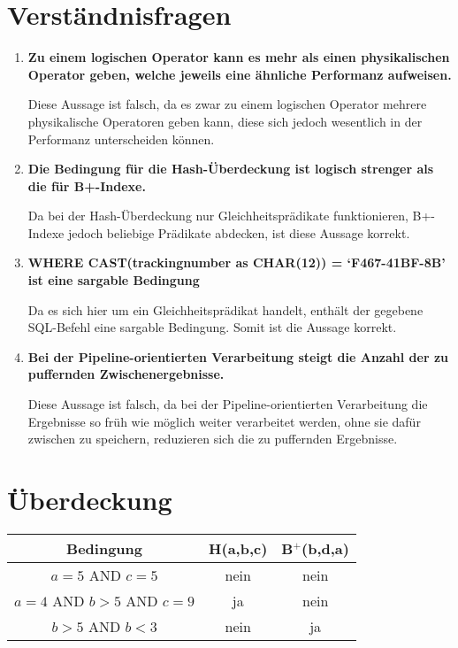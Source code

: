 \documentclass{scrartcl}
\begin{document}
\maketitle

\section{Verständnisfragen}
\begin{enumerate}
    \item \textbf{Zu einem logischen Operator kann es mehr als einen physikalischen Operator geben, welche jeweils eine ähnliche Performanz aufweisen.}

    Diese Aussage ist falsch, da es zwar zu einem logischen Operator mehrere physikalische Operatoren geben kann, diese sich jedoch wesentlich in der Performanz unterscheiden können.
    \item \textbf{Die Bedingung für die Hash-Überdeckung ist logisch strenger als die für B+-Indexe.}

    Da bei der Hash-Überdeckung nur Gleichheitsprädikate funktionieren, B+-Indexe jedoch beliebige Prädikate abdecken, ist diese Aussage korrekt.
    \item \textbf{WHERE CAST(trackingnumber as CHAR(12)) = ‘F467-41BF-8B’ ist eine sargable Bedingung}
    
    Da es sich hier um ein Gleichheitsprädikat handelt, enthält der gegebene SQL-Befehl eine sargable Bedingung. Somit ist die Aussage korrekt.
    \item \textbf{Bei der Pipeline-orientierten Verarbeitung steigt die Anzahl der zu puffernden Zwischenergebnisse.}
    
    Diese Aussage ist falsch, da bei der Pipeline-orientierten Verarbeitung die Ergebnisse so früh wie möglich weiter verarbeitet werden, ohne sie dafür zwischen zu speichern, reduzieren sich die zu puffernden Ergebnisse.
\end{enumerate}
\section{Überdeckung}
\begin{tabular}{|c|c|c|}
\hline
    Bedingung & H(a,b,c) & B$^+$(b,d,a)\\
\hline
\hline
    $a = 5$ AND $c = 5$ & nein & nein\\
\hline
    $a = 4$ AND $b > 5$ AND $c = 9$ & ja & nein \\
\hline
    $b > 5$ AND $b < 3$ & nein & ja\\
\hline
\end{tabular}
\end{document}

